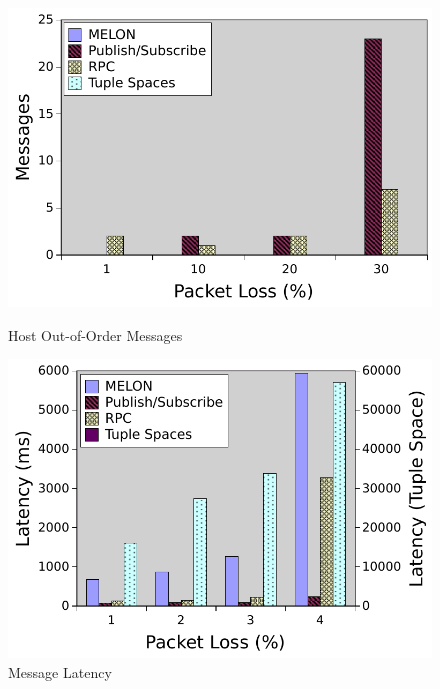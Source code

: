 \documentclass{llncs}
\begin{document}
\begin{figure}[ht]
\centering
\begin{minipage}[b]{0.48\linewidth}
\includegraphics[width = \textwidth]{figures/hooo.pdf}
\caption{Host Out-of-Order Messages}
\label{fig:hooo}
\end{minipage}
\quad
\begin{minipage}[b]{0.48\linewidth}

\includegraphics[width = \textwidth]{figures/latency.pdf}
\caption{Message Latency}
\label{fig:latency}
\end{minipage}
\end{figure}
\end{document}
